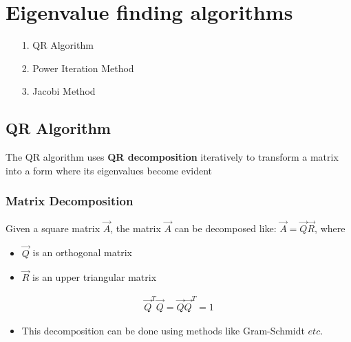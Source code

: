 \documentclass[journal]{IEEEtran}
\begin{document}
\section{\textbf{Eigenvalue finding algorithms}}
\begin{enumerate}
    \item [1.] QR Algorithm
    \item [2.] Power Iteration Method 
    \item [3.] Jacobi Method  
\end{enumerate}
\subsection{\textbf{QR Algorithm}}
The QR algorithm uses \textbf{QR decomposition} iteratively to transform a matrix into a form where its eigenvalues become evident\\
\subsubsection{Matrix Decomposition}
Given a square matrix $\vec{A}$, the matrix $\vec{A}$ can be decomposed like: $\vec{A}=\vec{Q}\vec{R}$, where 
\begin{itemize}
    \item $\vec{Q}$ is an orthogonal matrix 
    \item $\vec{R}$ is an upper triangular matrix
\end{itemize}
\begin{align*}
    \vec{Q}^T \vec{Q}= \vec{Q} \vec{Q}^T = 1
\end{align*}
\begin{itemize}
    \item This decomposition can be done using methods like Gram-Schmidt $etc$.\\
\end{itemize}
\end{document}

